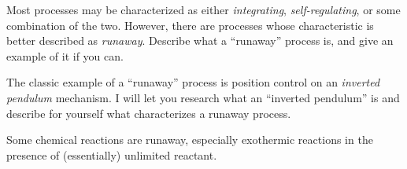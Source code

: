 

Most processes may be characterized as either {\it integrating}, {\it self-regulating}, or some combination of the two.  However, there are processes whose characteristic is better described as {\it runaway}.  Describe what a ``runaway'' process is, and give an example of it if you can.







The classic example of a ``runaway'' process is position control on an {\it inverted pendulum} mechanism.  I will let you research what an ``inverted pendulum'' is and describe for yourself what characterizes a runaway process.







Some chemical reactions are runaway, especially exothermic reactions in the presence of (essentially) unlimited reactant.




